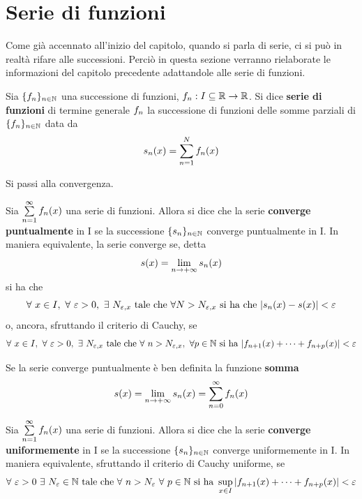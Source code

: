 \section{Serie di funzioni}
Come già accennato all'inizio del capitolo, quando si parla di serie, ci si può in realtà rifare alle successioni. Perciò in questa sezione verranno rielaborate le informazioni del capitolo precedente adattandole alle serie di funzioni.
\begin{definition}
    Sia $\{f_n\}_{n \in \mathbb{N}}$ una successione di funzioni, $f_n: I \subseteq \mathbb{R} \to \mathbb{R}$. Si dice \textbf{serie di funzioni} di termine generale $f_n$ la successione di funzioni delle somme parziali di $\{f_n\}_{n \in \mathbb{N}}$ data da
    \begin{equation}
        s_n(x)=\sum\limits_{n=1}^{N}{f_n(x)}
    \end{equation}
\end{definition}
Si passi alla convergenza.
\begin{definition}
    Sia $\sum\limits_{n=1}^{\infty}{f_n(x)}$ una serie di funzioni. Allora si dice che la serie \textbf{converge puntualmente} in I se la successione $\{s_n\}_{n \in \mathbb{N}}$ converge puntualmente in I. In maniera equivalente, la serie converge se, detta
    \begin{equation}
        s(x)=\lim_{n \to +\infty}{s_n(x)}
    \end{equation}
    si ha che
    \begin{equation}
        \forall\ x \in I,\ \forall\ \varepsilon>0,\ \exists\ N_{\varepsilon, x}\ \text{tale che}\ \forall N>N_{\varepsilon, x}\ \text{si ha che}\ |\sn(x)-s(x)|< \varepsilon
    \end{equation}
    o, ancora, sfruttando il criterio di Cauchy, se
    \begin{equation}
        \forall\ x \in I,\ \forall\ \varepsilon>0,\ \exists\ N_{\varepsilon, x}\ \text{tale che}\ \forall\ n>N_{\varepsilon, x},\ \forall p \in \N\ \text{si ha}\ |f_{n+1}(x)+ \dots+ f_{n+p}(x)|<\varepsilon
    \end{equation}
\end{definition}
\begin{definition}
    Se la serie converge puntualmente è ben definita la funzione \textbf{somma}
    \begin{equation}
        s(x)=\lim_{n \to +\infty}{s_n(x)}= \sum_{n=0}^{\infty}{f_n(x)}
    \end{equation}
\end{definition}
\begin{definition}
Sia $\sum\limits_{n=1}^{\infty}{f_n(x)}$ una serie di funzioni. Allora si dice che la serie \textbf{converge uniformemente} in I se la successione $\{s_n\}_{n \in \mathbb{N}}$ converge uniformemente in I. In maniera equivalente, sfruttando il criterio di Cauchy uniforme, se
\begin{equation}
\forall\ \varepsilon>0\ \exists\ N_\varepsilon \in \N\ \text{tale che}\ \forall\ n > N_\varepsilon\ \forall\ p \in \N\ \text{si ha}\ \sup_{x \in I}{|f_{n+1}(x)+\dots+f_{n+p}(x)|}<\varepsilon 
\end{equation}
\end{definition}
